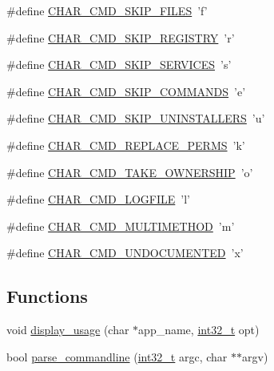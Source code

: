 \begin{DoxyCompactItemize}
\item 
\#define \hyperlink{_configuration_8h_a61fd4289d52a48709340e13b5a138f5a}{C\-H\-A\-R\-\_\-\-C\-M\-D\-\_\-\-S\-K\-I\-P\-\_\-\-F\-I\-L\-E\-S}~'f'
\item 
\#define \hyperlink{_configuration_8h_ad5764bedb21444348a3e9cc8c4b28a24}{C\-H\-A\-R\-\_\-\-C\-M\-D\-\_\-\-S\-K\-I\-P\-\_\-\-R\-E\-G\-I\-S\-T\-R\-Y}~'r'
\item 
\#define \hyperlink{_configuration_8h_adb044b8b0ed2b933082a1775e9ba05f0}{C\-H\-A\-R\-\_\-\-C\-M\-D\-\_\-\-S\-K\-I\-P\-\_\-\-S\-E\-R\-V\-I\-C\-E\-S}~'s'
\item 
\#define \hyperlink{_configuration_8h_afb643fad4eb807bb20f82df8318d7676}{C\-H\-A\-R\-\_\-\-C\-M\-D\-\_\-\-S\-K\-I\-P\-\_\-\-C\-O\-M\-M\-A\-N\-D\-S}~'e'
\item 
\#define \hyperlink{_configuration_8h_afbceb811cad6ce805ae2364d6300297c}{C\-H\-A\-R\-\_\-\-C\-M\-D\-\_\-\-S\-K\-I\-P\-\_\-\-U\-N\-I\-N\-S\-T\-A\-L\-L\-E\-R\-S}~'u'
\item 
\#define \hyperlink{_configuration_8h_a8b8959f4a8adf23ed2102d579c77cfca}{C\-H\-A\-R\-\_\-\-C\-M\-D\-\_\-\-R\-E\-P\-L\-A\-C\-E\-\_\-\-P\-E\-R\-M\-S}~'k'
\item 
\#define \hyperlink{_configuration_8h_af29560ffc1e11e021cf895abc4d1c286}{C\-H\-A\-R\-\_\-\-C\-M\-D\-\_\-\-T\-A\-K\-E\-\_\-\-O\-W\-N\-E\-R\-S\-H\-I\-P}~'o'
\item 
\#define \hyperlink{_configuration_8h_a3a7eb5d7c2dcba8dc5d2aaeb9035d301}{C\-H\-A\-R\-\_\-\-C\-M\-D\-\_\-\-L\-O\-G\-F\-I\-L\-E}~'l'
\item 
\#define \hyperlink{_configuration_8h_a1cf301de91e49b1beb44f071dc2813c7}{C\-H\-A\-R\-\_\-\-C\-M\-D\-\_\-\-M\-U\-L\-T\-I\-M\-E\-T\-H\-O\-D}~'m'
\item 
\#define \hyperlink{_configuration_8h_a7f175c3002a8dbde3e0d100c5ff22253}{C\-H\-A\-R\-\_\-\-C\-M\-D\-\_\-\-U\-N\-D\-O\-C\-U\-M\-E\-N\-T\-E\-D}~'x'
\end{DoxyCompactItemize}
\subsection*{Functions}
\begin{DoxyCompactItemize}
\item 
void \hyperlink{_configuration_8h_a60ca01793aec53a00452adb2caf780dc}{display\-\_\-usage} (char $\ast$app\-\_\-name, \hyperlink{stdint_8h_a32f2e37ee053cf2ce8ca28d1f74630e5}{int32\-\_\-t} opt)
\item 
bool \hyperlink{_configuration_8h_a77d8ecb3e2084eecf8db1cf62276bcf0}{parse\-\_\-commandline} (\hyperlink{stdint_8h_a32f2e37ee053cf2ce8ca28d1f74630e5}{int32\-\_\-t} argc, char $\ast$$\ast$argv)
\end{DoxyCompactItemize}


